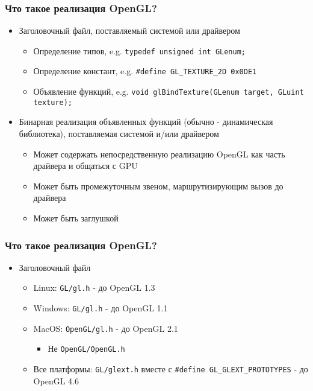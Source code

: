 \documentclass{beamer}
\begin{document}
\begin{frame}[fragile]
\frametitle{Что такое реализация OpenGL?}
\pause
\begin{itemize}
\item Заголовочный файл, поставляемый системой или драйвером
\begin{itemize}
\item Определение типов, e.g. \verb|typedef unsigned int GLenum;|
\item Определение констант, e.g. \verb|#define GL_TEXTURE_2D 0x0DE1|
\item Объявление функций, e.g. \verb|void glBindTexture(GLenum target, GLuint texture);|
\end{itemize}
\pause
\item Бинарная реализация объявленных функций (обычно - динамическая библиотека), поставляемая системой и/или драйвером
\begin{itemize}
\item Может содержать непосредственную реализацию OpenGL как часть драйвера и общаться с GPU
\item Может быть промежуточным звеном, маршрутизирующим вызов до драйвера
\item Может быть заглушкой
\end{itemize}
\end{itemize}
\end{frame}

\begin{frame}[fragile]
\frametitle{Что такое реализация OpenGL?}
\begin{itemize}
\item Заголовочный файл
\begin{itemize}
\item Linux: \verb|GL/gl.h| - до OpenGL 1.3
\pause
\item Windows: \verb|GL/gl.h| - до OpenGL 1.1
\pause
\item MacOS: \verb|OpenGL/gl.h| - до OpenGL 2.1
\begin{itemize}
\item {\color{red}Не} \verb|OpenGL/OpenGL.h|
\end{itemize}
\item Все платформы: \verb|GL/glext.h| вместе с \verb|#define GL_GLEXT_PROTOTYPES| - до OpenGL 4.6
\end{itemize}
\end{itemize}
\end{frame}
\end{document}
